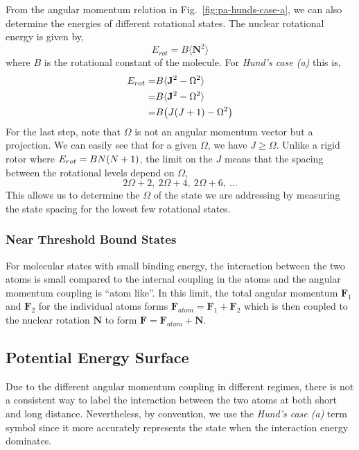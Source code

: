 From the angular momentum relation in Fig.~\ref{fig:pa-hunds-case-a},
we can also determine the energies of different rotational states.
The nuclear rotational energy is given by,
\[
  E_{rot}=B\langle \mathbf{N}^2 \rangle
\]
where $B$ is the rotational constant of the molecule.
For \textit{Hund's case (a)} this is,
\begin{align*}
  E_{rot}=&B\langle \mathbf{J}^2 - \Omega^2 \rangle\\
  =&B\langle \mathbf{J}^2 - \Omega^2 \rangle\\
  =&B{\left({J{\left({J+1}\right)}-\Omega^2}\right)}
\end{align*}
For the last step, note that $\Omega$ is not an angular momentum vector but a projection.
We can easily see that for a given $\Omega$, we have $J\geqslant\Omega$.
Unlike a rigid rotor where $E_{rot}=BN{\left({N+1}\right)}$,
the limit on the $J$ means that the spacing between the rotational levels depend on $\Omega$,
\[2\Omega+2,\ 2\Omega+4,\ 2\Omega+6,\ \dots\]
This allows us to determine the $\Omega$ of the state we are addressing
by measuring the state spacing for the lowest few rotational states.

\subsubsection{Near Threshold Bound States}
\label{pa:structure:near-threshold}

For molecular states with small binding energy, the interaction between the two atoms is
small compared to the internal coupling in the atoms and
the angular momentum coupling is ``atom like''.
In this limit, the total angular momentum $\mathbf{F}_1$ and $\mathbf{F}_2$
for the individual atoms forms $\mathbf{F}_{atom}=\mathbf{F}_1+\mathbf{F}_2$
which is then coupled to the nuclear rotation $\mathbf{N}$
to form $\mathbf{F}=\mathbf{F}_{atom}+\mathbf{N}$.


\subsection{Potential Energy Surface}
\label{ch:pa:pes}

Due to the different angular momentum coupling in different regimes,
there is not a consistent way to label the interaction between the two atoms
at both short and long distance.
Nevertheless, by convention, we use the \textit{Hund's case (a)} term symbol
since it more accurately represents the state when the interaction energy dominates.

